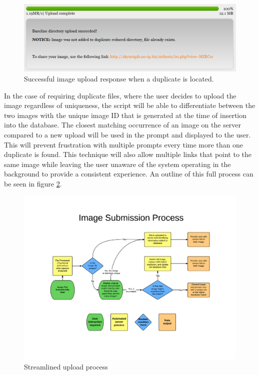 \begin{figure}[htbp]
\centering
\includegraphics[width=5.5in]{success_dupfound}
\caption{Successful image upload response when a duplicate is located.}
\label{success_dupfound}
\end{figure}

In the case of requiring duplicate files, where the user decides to upload the image regardless of uniqueness, the script will be able to differentiate between the two images with the unique image ID that is generated at the time of insertion into the database. The closest matching occurrence of an image on the server compared to a new upload will be used in the prompt and displayed to the user. This will prevent frustration with multiple prompts every time more than one duplicate is found. This technique will also allow multiple links that point to the same image while leaving the user unaware of the system operating in the background to provide a consistent experience. An outline of this full process can be seen in figure \ref{method-fig1}.

\begin{figure}[htbp]
\centering
\includegraphics[trim={3cm 3.5cm 2cm 4.2cm},clip, width=6in]{upproc}
\caption{Streamlined upload process}
\label{method-fig1}
\end{figure}

